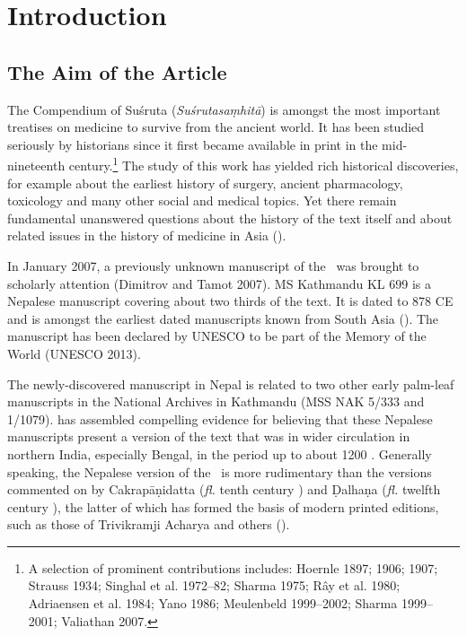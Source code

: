 \section{Introduction}

\subsection{The Aim of the Article}

The Compendium of Suśruta (\emph{Suśrutasaṃhitā}) is amongst the most important treatises on medicine to survive from the ancient world. It has been studied seriously by historians since it first became available in print in the mid-nineteenth century.\footnote{A selection of prominent contributions includes: Hoernle 1897; 1906; 1907; Strauss 1934; Singhal et al. 1972–82; Sharma 1975; Rây et al. 1980; Adriaensen et al. 1984; Yano 1986; Meulenbeld 1999–2002; Sharma 1999–2001; Valiathan 2007.} The study of this work has yielded rich historical discoveries, for example about the earliest history of surgery, ancient pharmacology, toxicology and many other social and medical topics. Yet there remain fundamental unanswered questions about the history of the text itself and about related issues in the history of medicine in Asia (\cite[IA, 203–389]{meul-hist}). 

In January 2007, a previously unknown manuscript of the \SS\ was brought to scholarly attention (Dimitrov and Tamot 2007). MS Kathmandu KL 699 is a Nepalese manuscript covering about two thirds of the text. It is dated to 878 CE and is amongst the earliest dated manuscripts known from South Asia (\cite[87–88]{hari-2011}). The manuscript has been declared by UNESCO to be part of the Memory of the World (UNESCO 2013).

The newly-discovered manuscript in Nepal is related to two other early palm-leaf manuscripts in the National Archives in Kathmandu (MSS NAK 5/333 and 1/1079). \citet{kleb-2010,kleb-2021b} has assembled compelling evidence for believing that these Nepalese manuscripts present a version of the text that was in wider circulation in northern India, especially Bengal, in the period up to about 1200 \AD. Generally speaking, the Nepalese version of the \SS\ is more rudimentary than the versions commented on by Cakrapāṇidatta (\emph{fl.} tenth century \AD) and Ḍalhaṇa (\emph{fl.} twelfth century \AD), the latter of which has formed the basis of modern printed editions, such as those of Trivikramji Acharya and others (\cite{susr-trikamji1,vulgate,shar-susr}). 

